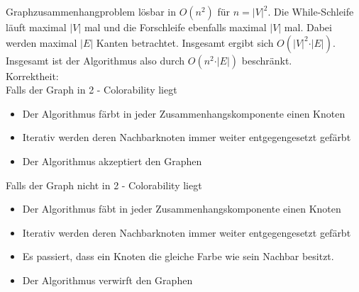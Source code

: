 \documentclass{article}
\begin{document}
\begin{enumerate}[label=(\alph*).]
		Graphzusammenhangproblem lösbar in $O(n^2)$ für $n = \vert V \vert^2$. Die While-Schleife läuft maximal $\vert V\vert$ mal und die Forschleife ebenfalls maximal $\vert V\vert$ mal. Dabei werden maximal $\vert E\vert$ Kanten betrachtet. Insgesamt ergibt sich $O(\vert V\vert^2 \cdot \vert E\vert)$. Insgesamt ist der Algorithmus also durch $O(n^2 \cdot \vert E\vert)$ beschränkt.\\
		
		Korrektheit:\\
		Falls der Graph in 2 - Colorability liegt
		\begin{itemize}
			\item Der Algorithmus färbt in jeder Zusammenhangskomponente einen Knoten
			\item Iterativ werden deren Nachbarknoten immer weiter entgegengesetzt gefärbt
			\item Der Algorithmus akzeptiert den Graphen
		\end{itemize}	
		Falls der Graph nicht in 2 - Colorability liegt
		\begin{itemize}
			\item Der Algorithmus fäbt in jeder Zusammenhangskomponente einen Knoten
			\item Iterativ werden deren Nachbarknoten immer weiter entgegengesetzt gefärbt
			\item Es passiert, dass ein Knoten die gleiche Farbe wie sein Nachbar besitzt. 
			\item Der Algorithmus verwirft den Graphen
		\end{itemize}
	\end{enumerate}
\end{document}
